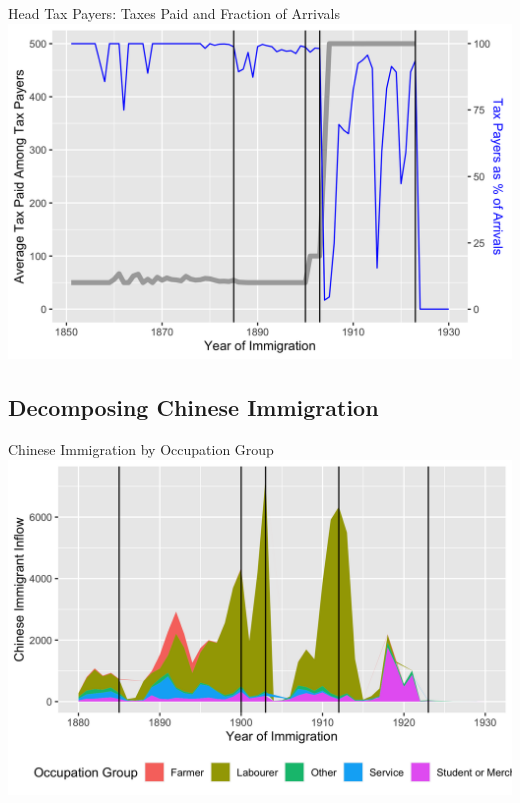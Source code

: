 \documentclass[pdf]{beamer}
\begin{document}
\begin{frame}{Head Tax Payers: Taxes Paid and Fraction of Arrivals}
    \includegraphics[width = \textwidth]{../../figs/taxbyyear.png}
\end{frame}

\subsection{Decomposing Chinese Immigration}
\begin{frame}{Chinese Immigration by Occupation Group}
    \includegraphics[width = \textwidth]{../../figs/chiocc.png}
\end{frame}

\appendix
\end{document}

